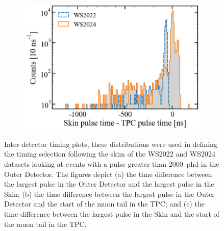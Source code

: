 \begin{figure}[htbp]
\begin{subfigure}{0.5\textwidth}
    \includegraphics[width=\textwidth]{figures/Muons/Skin-TPC_timing.pdf}
    \caption{}
    \label{fig:Skin-TPC}
\end{subfigure}
\caption{Inter-detector timing plots, these distributions were used in defining the timing selection following the skim of the WS2022 and WS2024 datasets looking at events with a pulse greater than 2000~phd in the Outer Detector. The figures depict (a) the time difference between the largest pulse in the Outer Detector and the largest pulse in the Skin; (b) the time difference between the largest pulse in the Outer Detector and the start of the muon tail in the TPC; and (c) the time difference between the largest pulse in the Skin and the start of the muon tail in the TPC.}
\label{fig:timing_plots}
\end{figure}

